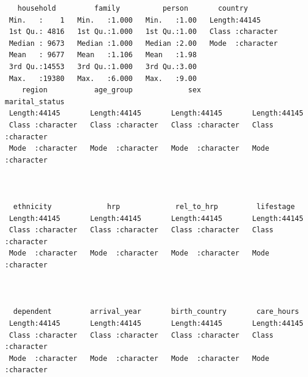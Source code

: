 \documentclass[
  letterpaper,
  DIV=11,
  numbers=noendperiod]{scrreprt}
\begin{document}
\begin{verbatim}
   household         family          person       country         
 Min.   :    1   Min.   :1.000   Min.   :1.00   Length:44145      
 1st Qu.: 4816   1st Qu.:1.000   1st Qu.:1.00   Class :character  
 Median : 9673   Median :1.000   Median :2.00   Mode  :character  
 Mean   : 9677   Mean   :1.106   Mean   :1.98                     
 3rd Qu.:14553   3rd Qu.:1.000   3rd Qu.:3.00                     
 Max.   :19380   Max.   :6.000   Max.   :9.00                     
    region           age_group             sex            marital_status    
 Length:44145       Length:44145       Length:44145       Length:44145      
 Class :character   Class :character   Class :character   Class :character  
 Mode  :character   Mode  :character   Mode  :character   Mode  :character  
                                                                            
                                                                            
                                                                            
  ethnicity             hrp             rel_to_hrp         lifestage        
 Length:44145       Length:44145       Length:44145       Length:44145      
 Class :character   Class :character   Class :character   Class :character  
 Mode  :character   Mode  :character   Mode  :character   Mode  :character  
                                                                            
                                                                            
                                                                            
  dependent         arrival_year       birth_country       care_hours       
 Length:44145       Length:44145       Length:44145       Length:44145      
 Class :character   Class :character   Class :character   Class :character  
 Mode  :character   Mode  :character   Mode  :character   Mode  :character  
                                                                            
                                                                            
                                                                            

\end{verbatim}
\end{document}
